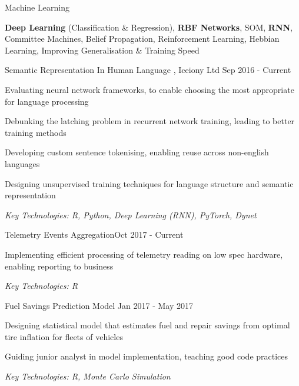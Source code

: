 \documentclass[11pt,article,oneside]{memoir}
\newenvironment{itemize*}{%
  \renewcommand\labelitemi{\textbullet}
  \footnotesize
  \begin{itemize}%
    \setlength{\itemsep}{0pt}}%
  {\end{itemize}
}
\begin{document}
\ind Machine Learning 

\ind \hspace{0.354in} \footnotesize \textbf{Deep Learning} (Classification \& Regression), \textbf{RBF Networks}, SOM, \textbf{RNN}, Committee Machines,
Belief Propagation, Reinforcement Learning, Hebbian Learning, Improving Generalisation \& Training Speed \normalsize

\bigskip
 

\normalsize
\medskip
\ind Semantic Representation In Human Language , Iceiony Ltd \hfill Sep 2016 - Current
\begin{itemize*}
  \item Evaluating neural network frameworks, to enable choosing the most appropriate for language processing
  \item Debunking the latching problem in recurrent network training, leading to better training methods 
  \item Developing custom sentence tokenising, enabling reuse across non-english languages
  \item Designing unsupervised training techniques for language structure and semantic representation
\end{itemize*}
\ind \hspace{0.35in} \footnotesize \emph{Key Technologies: R, Python, Deep Learning (RNN), PyTorch, Dynet}

\normalsize
\medskip
\ind Telemetry Events Aggregation\hfill Oct 2017 - Current
\begin{itemize*}
  \item Implementing efficient processing of telemetry reading on low spec hardware, enabling reporting to business 
\end{itemize*}
\ind \hspace{0.35in} \footnotesize \emph{Key Technologies: R}

\normalsize
\medskip
\ind Fuel Savings Prediction Model \hfill Jan 2017 - May 2017
\begin{itemize*}
  \item Designing statistical model that estimates fuel and repair savings from optimal tire inflation for fleets of vehicles
  \item Guiding junior analyst in model implementation, teaching good code practices
\end{itemize*}
\ind \hspace{0.35in} \footnotesize \emph{Key Technologies: R, Monte Carlo Simulation}
\end{document}
